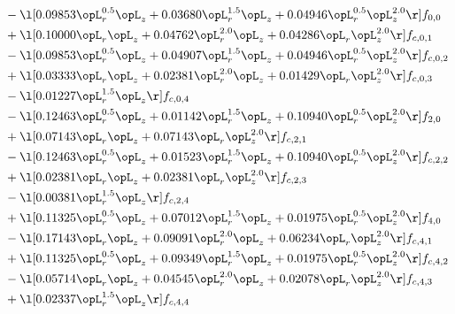 \begin{alignat}{2}
& - \l[  0.09853 \opL_r^{0.5} \opL_z +  0.03680 \opL_r^{1.5} \opL_z +  0.04946 \opL_r^{0.5} \opL_z^{2.0}  \r] f_{0,0} \nonumber \\ 
& + \l[  0.10000 \opL_r \opL_z +  0.04762 \opL_r^{2.0} \opL_z +  0.04286 \opL_r \opL_z^{2.0}  \r] f_{c,0,1} \nonumber \\ 
& - \l[  0.09853 \opL_r^{0.5} \opL_z +  0.04907 \opL_r^{1.5} \opL_z +  0.04946 \opL_r^{0.5} \opL_z^{2.0}  \r] f_{c,0,2} \nonumber \\ 
& + \l[  0.03333 \opL_r \opL_z +  0.02381 \opL_r^{2.0} \opL_z +  0.01429 \opL_r \opL_z^{2.0}  \r] f_{c,0,3} \nonumber \\ 
& - \l[  0.01227 \opL_r^{1.5} \opL_z  \r] f_{c,0,4} \nonumber \\ 
& - \l[  0.12463 \opL_r^{0.5} \opL_z +  0.01142 \opL_r^{1.5} \opL_z +  0.10940 \opL_r^{0.5} \opL_z^{2.0}  \r] f_{2,0} \nonumber \\ 
& + \l[  0.07143 \opL_r \opL_z +  0.07143 \opL_r \opL_z^{2.0}  \r] f_{c,2,1} \nonumber \\ 
& - \l[  0.12463 \opL_r^{0.5} \opL_z +  0.01523 \opL_r^{1.5} \opL_z +  0.10940 \opL_r^{0.5} \opL_z^{2.0}  \r] f_{c,2,2} \nonumber \\ 
& + \l[  0.02381 \opL_r \opL_z +  0.02381 \opL_r \opL_z^{2.0}  \r] f_{c,2,3} \nonumber \\ 
& - \l[  0.00381 \opL_r^{1.5} \opL_z  \r] f_{c,2,4} \nonumber \\ 
& + \l[  0.11325 \opL_r^{0.5} \opL_z +  0.07012 \opL_r^{1.5} \opL_z +  0.01975 \opL_r^{0.5} \opL_z^{2.0}  \r] f_{4,0} \nonumber \\ 
& - \l[  0.17143 \opL_r \opL_z +  0.09091 \opL_r^{2.0} \opL_z +  0.06234 \opL_r \opL_z^{2.0}  \r] f_{c,4,1} \nonumber \\ 
& + \l[  0.11325 \opL_r^{0.5} \opL_z +  0.09349 \opL_r^{1.5} \opL_z +  0.01975 \opL_r^{0.5} \opL_z^{2.0}  \r] f_{c,4,2} \nonumber \\ 
& - \l[  0.05714 \opL_r \opL_z +  0.04545 \opL_r^{2.0} \opL_z +  0.02078 \opL_r \opL_z^{2.0}  \r] f_{c,4,3} \nonumber \\ 
& + \l[  0.02337 \opL_r^{1.5} \opL_z  \r] f_{c,4,4} \nonumber \\ 
\end{alignat} 


